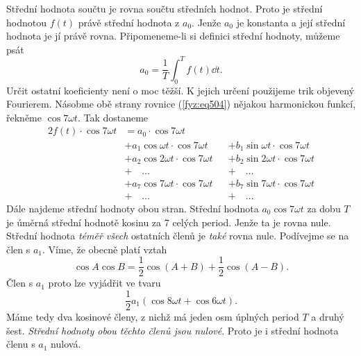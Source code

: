   Střední hodnota součtu je rovna součtu středních hodnot. Proto je střední hodnotou \(f(t)\) právě 
  střední hodnota z \(a_0\). Jenže \(a_0\) je konstanta a její střední hodnota je jí právě rovna. 
  Připomeneme-li si definici střední hodnoty, můžeme psát
  \begin{equation}\label{fyz:eq505}
    a_0 = \frac{1}{T}\int_0^Tf(t)\dd{t}.
  \end{equation}
  Určit ostatní koeficienty není o moc těžší. K jejich určení použijeme trik objevený Fourierem. 
  Násobme obě strany rovnice (\ref{fyz:eq504}) nějakou harmonickou funkcí, řekněme \(\cos7\omega 
  t\). Tak dostaneme
   \begin{alignat}{2}
     f(t)\cdot\cos 7\omega t
         &=a_0\cdot\cos 7\omega t               &&                                      \nonumber \\
         &+ a_1\cos\omega  t\cdot\cos 7\omega t &&+ b_1\sin \omega t\cdot\cos 7\omega t \nonumber \\
         &+ a_2\cos2\omega t\cdot\cos 7\omega t &&+ b_2\sin2\omega t\cdot\cos 7\omega t \nonumber \\
         &+ \quad\ldots                         &&+\quad\ldots                          \nonumber \\
         &+ a_7\cos7\omega t\cdot\cos 7\omega t &&+ b_7\sin7\omega t\cdot\cos 7\omega t \nonumber \\
         &+ \quad\ldots                         &&+\quad\ldots                   \label{fyz:eq506}
   \end{alignat}
  Dále najdeme střední hodnoty obou stran. Střední hodnota \(a_0\cos 7\omega t\) za dobu \(T\) je 
  úměrná střední hodnotě kosinu za \num{7} celých period. Jenže ta je rovna nule. Střední hodnota 
  \emph{téměř všech} ostatních členů je \emph{také} rovna nule. Podívejme se na člen s \(a_1\). 
  Víme, že obecně platí vztah
  \begin{equation}\label{fyz:eq507}
    \cos A\cos B = \frac{1}{2}\cos(A+B) + \frac{1}{2}\cos(A-B).
  \end{equation}
  Člen s \(a_1\) proto lze vyjádřit ve tvaru
  \begin{equation}\label{fyz:eq508}
    \frac{1}{2}a_1(\cos 8\omega t + \cos 6\omega t).
  \end{equation}
  Máme tedy dva kosinové členy, z nichž má jeden osm úplných period \(T\) a druhý šest. 
  \emph{Střední hodnoty obou těchto členů jsou nulové}. Proto je i střední hodnota členu s \(a_1\) 
  nulová. 
  
